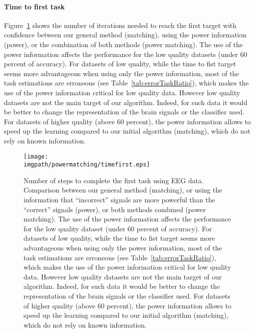\paragraph{Time to first task} Figure~\ref{fig:timefirst_powermatching} shows the number of iterations needed to reach the first target with confidence between our general method (matching), using the power information (power), or the combination of both methods (power matching). The use of the power information affects the performance for the low quality datasets (under 60 percent of accuracy). For datasets of low quality, while the time to fist target seems more advantageous when using only the power information, most of the task estimations are erroneous (see Table~\ref{tab:errorTaskRatio}), which makes the use of the power information critical for low quality data. However low quality datasets are not the main target of our algorithm. Indeed, for such data it would be better to change the representation of the brain signals or the classifier used. For datasets of higher quality (above 60 percent), the power information allows to speed up the learning compared to our initial algorithm (matching), which do not rely on known information.

\begin{figure}[!htbp]
\centering
\texttt{[image: \\imgpath/powermatching/timefirst.eps]}
\caption{Number of steps to complete the first task using EEG data. Comparison between our general method (matching), or using the information that ``incorrect'' signals are more powerful than the ``correct'' signals (power), or both methods combined (power matching). The use of the power information affects the performance for the low quality dataset (under 60 percent of accuracy). For datasets of low quality, while the time to fist target seems more advantageous when using only the power information, most of the task estimations are erroneous (see Table~\ref{tab:errorTaskRatio}), which makes the use of the power information critical for low quality data. However low quality datasets are not the main target of our algorithm. Indeed, for such data it would be better to change the representation of the brain signals or the classifier used. For datasets of higher quality (above 60 percent), the power information allows to speed up the learning compared to our initial algorithm (matching), which do not rely on known information.}
\label{fig:timefirst_powermatching}
\end{figure} 

